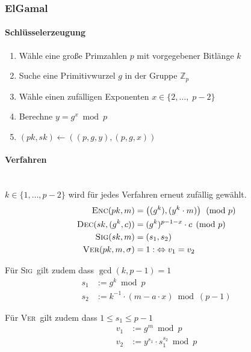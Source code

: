 \documentclass[a4paper,landscape]{article}
\newcommand{\plaint}{\ensuremath{m}}
\newcommand{\ciphert}{\ensuremath{c}}
\newcommand{\skey}{\ensuremath{sk}}
\newcommand{\pkey}{\ensuremath{pk}}
\newcommand{\enc}{\textsc{Enc}}
\newcommand{\dec}{\textsc{Dec}}
\newcommand{\sig}{\textsc{Sig}}
\newcommand{\ver}{\textsc{Ver}}
\begin{document}
\begin{multicols*}{4}
	\subsubsection{ElGamal}
	\paragraph{Schlüsselerzeugung}
	\begin{enumerate}
		\item Wähle eine große Primzahlen \(p\) mit vorgegebener Bitlänge \(k\)
		\item Suche eine Primitivwurzel \(g\) in der Gruppe \(\mathbb{Z}_{p}\)
		\item Wähle einen zufälligen Exponenten \(x \in\{2,\ldots,\;p-2\}\)
		\item Berechne \(y = g^{x} \bmod p\)
		\item \((\pkey,\skey) \leftarrow ((p,g,y),(p,g,x))\)
	\end{enumerate}

	\paragraph{Verfahren} \,\\
	\(k \in\{1,\ldots,p-2\}\) wird für jedes Verfahren erneut zufällig gewählt.
	\begin{align*}
		\enc(\pkey,\plaint)          & = \left((g^{k}),(y^{k} \cdot \plaint)\right) \pmod{p} \\
		\dec(\skey,(g^{k},\ciphert)) & = (g^{k})^{p-1-x} \cdot \ciphert \pmod{p}             \\
		\sig(\skey,\plaint)          & = (s_{1},s_{2})                                       \\
		\ver(\pkey,\plaint,\sigma)   & = 1 :\;\Leftrightarrow v_{1} = v_{2}
	\end{align*}

	Für \sig\ gilt zudem dass \(\gcd(k,p-1) = 1\)
	\begin{align*}
		s_{1} & := g^{k} \bmod p                                  \\
		s_{2} & := k^{-1} \cdot (\plaint - a \cdot x) \bmod (p-1)
	\end{align*}

	Für \ver\ gilt zudem dass \(1 \leq s_{1} \leq p-1\)
	\begin{align*}
		v_{1} & := g^{\plaint} \bmod p                   \\
		v_{2} & := y^{s_{1}} \cdot s_{1}^{s_{2}} \bmod p
	\end{align*}


\end{multicols*}
\end{document}
